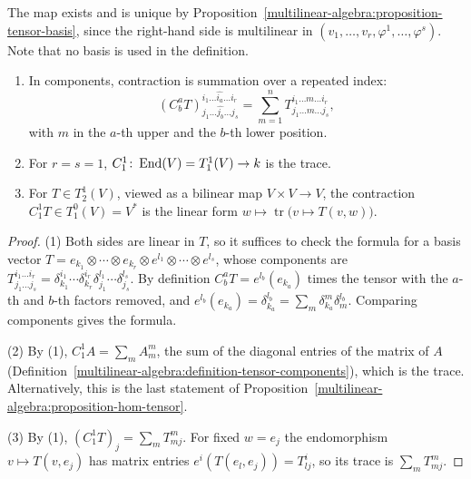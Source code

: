 The map exists and is unique by Proposition~\ref{multilinear-algebra:proposition-tensor-basis}, since the right-hand side is multilinear in $(v_1, \ldots, v_r, \varphi^1, \ldots, \varphi^s)$.
Note that no basis is used in the definition.

\begin{proposition}\label{multilinear-algebra:proposition-contraction}
\begin{enumerate}
\item In components, contraction is summation over a repeated index:
\[
(C^a_bT)^{i_1 \ldots \widehat{i_a} \ldots i_r}_{j_1 \ldots \widehat{j_b} \ldots j_s} = \sum_{m=1}^nT^{i_1 \ldots m \ldots i_r}_{j_1 \ldots m \ldots j_s},
\]
with $m$ in the $a$-th upper and the $b$-th lower position.
\item For $r = s = 1$, $C^1_1 \colon \operatorname{End}(V) = T^1_1(V) \to k$ is the trace.
\item For $T \in T^1_2(V)$, viewed as a bilinear map $V \times V \to V$, the contraction $C^1_1T \in T^0_1(V) = V^*$ is the linear form $w \mapsto \operatorname{tr}\bigl(v \mapsto T(v, w)\bigr)$.
\end{enumerate}
\end{proposition}

\begin{proof}
(1) Both sides are linear in $T$, so it suffices to check the formula for a basis vector $T = e_{k_1} \otimes \cdots \otimes e_{k_r} \otimes e^{l_1} \otimes \cdots \otimes e^{l_s}$, whose components are
$T^{i_1 \ldots i_r}_{j_1 \ldots j_s} = \delta^{i_1}_{k_1} \cdots \delta^{i_r}_{k_r}\delta^{l_1}_{j_1} \cdots \delta^{l_s}_{j_s}$. By definition $C^a_bT = e^{l_b}(e_{k_a})$ times the tensor with the
$a$-th and $b$-th factors removed, and $e^{l_b}(e_{k_a}) = \delta^{l_b}_{k_a} = \sum_m\delta^m_{k_a}\delta^{l_b}_m$. Comparing components gives the formula.

(2) By (1), $C^1_1A = \sum_mA^m_m$, the sum of the diagonal entries of the matrix of $A$ (Definition~\ref{multilinear-algebra:definition-tensor-components}), which is the trace. Alternatively,
this is the last statement of Proposition~\ref{multilinear-algebra:proposition-hom-tensor}.

(3) By (1), $(C^1_1T)_j = \sum_mT^m_{mj}$. For fixed $w = e_j$ the endomorphism $v \mapsto T(v, e_j)$ has matrix entries $e^i(T(e_l, e_j)) = T^i_{lj}$, so its trace is $\sum_mT^m_{mj}$.
\end{proof}


